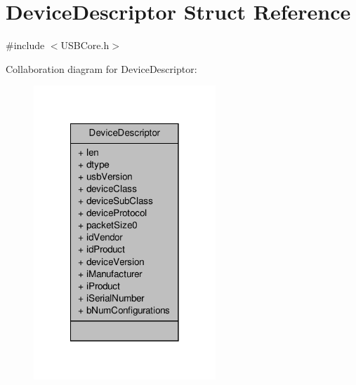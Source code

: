 \hypertarget{struct_device_descriptor}{\section{Device\-Descriptor Struct Reference}
\label{struct_device_descriptor}
}


{\ttfamily \#include $<$U\-S\-B\-Core.\-h$>$}



Collaboration diagram for Device\-Descriptor\-:
\nopagebreak
\begin{figure}[H]
\begin{center}
\leavevmode
\includegraphics[width=194pt]{struct_device_descriptor__coll__graph}
\end{center}
\end{figure}
